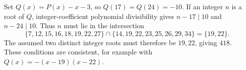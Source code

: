 Set $Q(x)=P(x)-x-3$, so $Q(17)=Q(24)=-10$. If an integer $n$ is a root of $Q$, integer-coefficient polynomial divisibility gives $n-17\mid10$ and $n-24\mid10$. Thus $n$ must lie in the intersection
\[
\{7,12,15,16,18,19,22,27\}\cap
\{14,19,22,23,25,26,29,34\}=\{19,22\}.
\]
The assumed two distinct integer roots must therefore be $19,22$, giving $\boxed{418}$. These conditions are consistent, for example with $Q(x)=-(x-19)(x-22)$.
